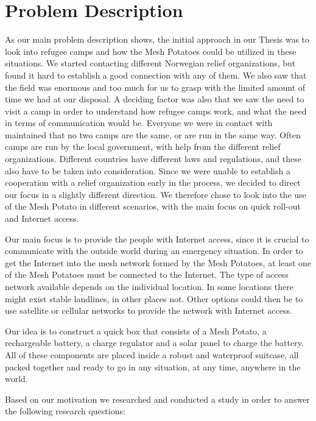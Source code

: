 \section{Problem Description}
As our main problem description shows, the initial approach in our Thesis was to look into refugee camps and how the Mesh Potatoes could be utilized in these situations. We started contacting different Norwegian relief organizations, but found it hard to establish a good connection with any of them. We also saw that the field was enormous and too much for us to grasp with the limited amount of time we had at our disposal. A deciding factor was also that we saw the need to visit a camp in order to understand how refugee camps work, and what the need in terms of communication would be. Everyone we were in contact with maintained that no two camps are the same, or are run in the same way. Often camps are run by the local government, with help from the different relief organizations. Different countries have different laws and regulations, and these also have to be taken into consideration. Since we were unable to establish a cooperation with a relief organization early in the process, we decided to direct our focus in a slightly different direction. We therefore chose to look into the use of the Mesh Potato in different scenarios, with the main focus on quick roll-out and Internet access.

Our main focus is to provide the people with Internet access, since it is crucial to communicate with the outside world during an emergency situation. In order to get the Internet into the mesh network formed by the Mesh Potatoes, at least one of the Mesh Potatoes must be connected to the Internet. The type of access network available depends on the individual location. In some locations there might exist stable landlines, in other places not. Other options could then be to use satellite or cellular networks to provide the network with Internet access.  

Our idea is to construct a \gls{quick} box that consists of a Mesh Potato, a rechargeable battery, a charge regulator and a solar panel to charge the battery. All of these components are placed inside a robust and waterproof suitcase, all packed together and ready to go in any situation, at any time, anywhere in the world. 

Based on our motivation we researched and conducted a study in order to answer the following research questions: 

